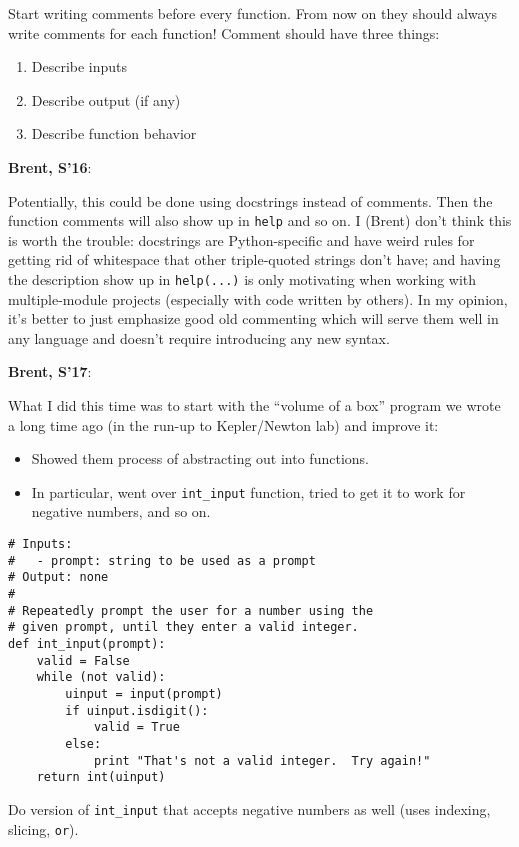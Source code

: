 \documentclass{article}
\newenvironment{reflect}[1]
{
  \noindent
  \begin{lrbox}{\reflectbox}
    \begin{minipage}[t]{\textwidth}
      \textbf{#1}:
}{
    \end{minipage}
  \end{lrbox}
  \fbox{\usebox{\reflectbox}}
}
\begin{document}
Start writing comments before every function.  From now on they should
always write comments for each function!  Comment should have three
things:
\begin{enumerate}
\item Describe inputs
\item Describe output (if any)
\item Describe function behavior
\end{enumerate}

\begin{reflect}{Brent, S'16}
  Potentially, this could be done using docstrings instead of
  comments. Then the function comments will also show up in
  \verb|help| and so on. I (Brent) don't think this is worth the
  trouble: docstrings are Python-specific and have weird rules for
  getting rid of whitespace that other triple-quoted strings don't
  have; and having the description show up in \verb|help(...)| is only
  motivating when working with multiple-module projects (especially
  with code written by others).  In my opinion, it's better
  to just emphasize good old commenting which will serve them well in
  any language and doesn't require introducing any new syntax.
\end{reflect}

\begin{reflect}{Brent, S'17}
  What I did this time was to start with the ``volume of a box''
  program we wrote a long time ago (in the run-up to Kepler/Newton
  lab) and improve it:
  \begin{itemize}
  \item Showed them process of abstracting out into functions.
  \item In particular, went over \verb|int_input| function, tried to
    get it to work for negative numbers, and so on.
  \end{itemize}
\end{reflect}

\begin{verbatim}
# Inputs:
#   - prompt: string to be used as a prompt
# Output: none
#
# Repeatedly prompt the user for a number using the
# given prompt, until they enter a valid integer.
def int_input(prompt):
    valid = False
    while (not valid):
        uinput = input(prompt)
        if uinput.isdigit():
            valid = True
        else:
            print "That's not a valid integer.  Try again!"
    return int(uinput)
\end{verbatim}

Do version of \verb|int_input| that accepts negative numbers as well
(uses indexing, slicing, \verb|or|).
\end{document}
